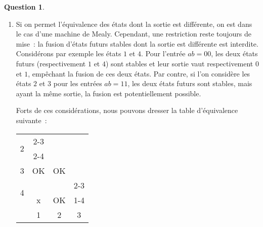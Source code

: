 \documentclass[11pt,a4paper,dvipsnames,]{article}
\theoremstyle{definition}%
\newtheorem{Q}{Question}[] %
\begin{document}
\begin{Q}
{\begin{enumerate}
\begin{center}

		\end{center}

		\item Si on permet l'équivalence des états dont la sortie est différente, on est dans le cas d'une machine de Mealy.
		Cependant, une restriction reste toujours de mise~: la fusion d'états futurs stables dont la sortie est différente est interdite.
		Considérons par exemple les états $1$ et $4$. Pour l'entrée $ab = 00$, les deux états futurs (respectivement $1$ et $4$) sont stables et leur sortie vaut respectivement $0$ et $1$, empêchant la fusion de ces deux états.
		Par contre, si l'on considère les états $2$ et $3$ pour les entrées $ab = 11$, les deux états futurs sont stables, mais ayant la même sortie, la fusion est potentiellement possible.

		Forts de ces considérations, nous pouvons dresser la table d'équivalence suivante~:
		\begin{center}
			\begin{tabular}{cccc} \cline{1-2}
				\multicolumn{1}{|c|}{\multirow{2}{*}{2}}	&	\multicolumn{1}{c|}{\cellcolor{green!25}2-3} 					& 																	& \\
				\multicolumn{1}{|c|}{}						&	\multicolumn{1}{c|}{\cellcolor{green!25}2-4}					& 																	& \\ \cline{1-3}
				\multicolumn{1}{|c|}{3}	& 						\multicolumn{1}{c|}{\cellcolor{green!25}OK}						& \multicolumn{1}{c|}{\cellcolor{green!25} OK}						& \\ \cline{1-4}
				\multicolumn{1}{|c|}{\multirow{2}{*}{4}} & 		\multicolumn{1}{c|}{\cellcolor{red!25}}							& \multicolumn{1}{|c|}{\cellcolor{green!25}} 						& \multicolumn{1}{c|}{\cellcolor{red!25}2-3}\\
				\multicolumn{1}{|c|}{} & 						\multicolumn{1}{c|}{\multirow{-2}{*}{\cellcolor{red!25}x}} 	& \multicolumn{1}{|c|}{\multirow{-2}{*}{\cellcolor{green!25}OK}} 	& \multicolumn{1}{c|}{\cellcolor{red!25}1-4} \\ \cline{1-4}
			 & 													\multicolumn{1}{|c|}{1} & 										\multicolumn{1}{c|}{2} 											& \multicolumn{1}{c|}{3} \\ \cline{2-4}
			\end{tabular}
		\end{center}


\end{enumerate}}
\end{Q}
\end{document}
